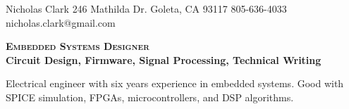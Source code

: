\documentclass[letterpaper, 10pt]{article}
\begin{document}
\nrctitle
{Nicholas Clark}
{246 Mathilda Dr.}
{Goleta, CA 93117}
{805-636-4033}
{nicholas.clark@gmail.com}
%
\begin{center}
\Large \textbf{\textsc{Embedded Systems Designer}}\\
\large \textbf{{Circuit Design, Firmware, Signal Processing, Technical Writing}}\par
\smallskip
Electrical engineer with six years experience in embedded systems. 
Good with SPICE simulation, FPGAs, microcontrollers, and DSP algorithms. 
\end{center}
\par \bigskip
\nrctwocols
{\noindent \begin{minipage}[t]{0.45\textwidth} \par \smallskip \blindtext \end{minipage}}
\end{document}
